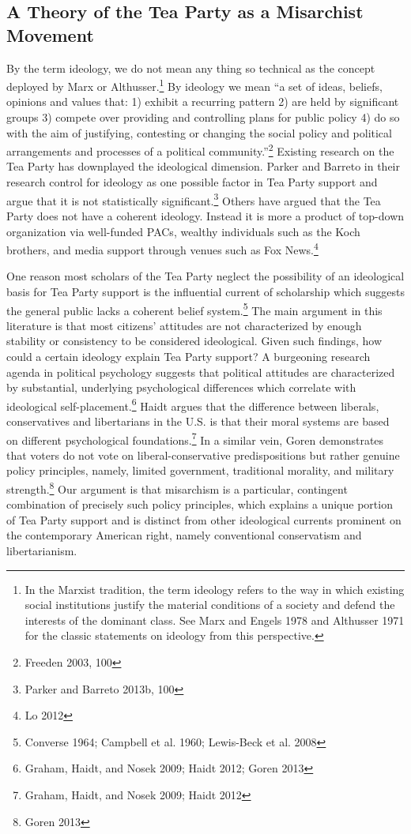 \documentclass[12pt,]{article}
\begin{document}
\subsection{A Theory of the Tea Party as a Misarchist
Movement}\label{a-theory-of-the-tea-party-as-a-misarchist-movement}

By the term ideology, we do not mean any thing so technical as the
concept deployed by Marx or Althusser.\footnote{In the Marxist
  tradition, the term ideology refers to the way in which existing
  social institutions justify the material conditions of a society and
  defend the interests of the dominant class. See Marx and Engels 1978
  and Althusser 1971 for the classic statements on ideology from this
  perspective.} By ideology we mean ``a set of ideas, beliefs, opinions
and values that: 1) exhibit a recurring pattern 2) are held by
significant groups 3) compete over providing and controlling plans for
public policy 4) do so with the aim of justifying, contesting or
changing the social policy and political arrangements and processes of a
political community.''\footnote{Freeden 2003, 100} Existing research on
the Tea Party has downplayed the ideological dimension. Parker and
Barreto in their research control for ideology as one possible factor in
Tea Party support and argue that it is not statistically
significant.\footnote{Parker and Barreto 2013b, 100} Others have argued
that the Tea Party does not have a coherent ideology. Instead it is more
a product of top-down organization via well-funded PACs, wealthy
individuals such as the Koch brothers, and media support through venues
such as Fox News.\footnote{Lo 2012}

One reason most scholars of the Tea Party neglect the possibility of an
ideological basis for Tea Party support is the influential current of
scholarship which suggests the general public lacks a coherent belief
system.\footnote{Converse 1964; Campbell et al. 1960; Lewis-Beck et al.
  2008} The main argument in this literature is that most citizens'
attitudes are not characterized by enough stability or consistency to be
considered ideological. Given such findings, how could a certain
ideology explain Tea Party support? A burgeoning research agenda in
political psychology suggests that political attitudes are characterized
by substantial, underlying psychological differences which correlate
with ideological self-placement.\footnote{Graham, Haidt, and Nosek 2009;
  Haidt 2012; Goren 2013} Haidt argues that the difference between
liberals, conservatives and libertarians in the U.S. is that their moral
systems are based on different psychological foundations.\footnote{Graham,
  Haidt, and Nosek 2009; Haidt 2012} In a similar vein, Goren
demonstrates that voters do not vote on liberal-conservative
predispositions but rather genuine policy principles, namely, limited
government, traditional morality, and military strength.\footnote{Goren
  2013} Our argument is that misarchism is a particular, contingent
combination of precisely such policy principles, which explains a unique
portion of Tea Party support and is distinct from other ideological
currents prominent on the contemporary American right, namely
conventional conservatism and libertarianism.
\end{document}
